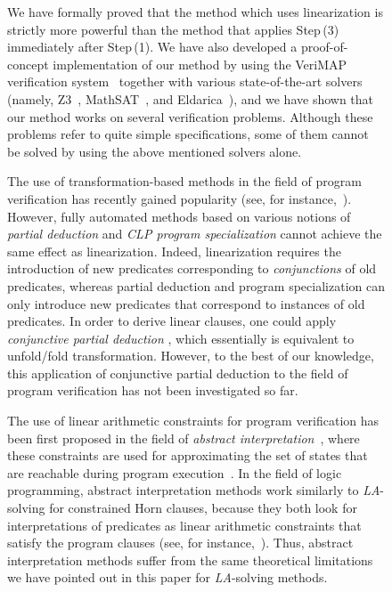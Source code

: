 \documentclass[english]{tlp}
\begin{document}
\begin{figure}[ht]
\begin{flushleft}
\begin{minipage}{124mm}
We have formally proved that the method {which uses} {\rm linearization} 
is strictly more
powerful than the method that applies Step\,(3) immediately after Step\,(1).
We have also developed a proof-of-concept implementation of our method 
by using the VeriMAP verification system~\cite{De&14b} together with 
various state-of-the-art solvers
(namely, Z3~\cite{DeB08}, MathSAT~\cite{MaS13}, and Eldarica~\cite{Ru&13}), and we 
have shown that our method works on several verification problems.
Although these problems refer to
quite simple specifications, some of them cannot be solved by {using the above mentioned solvers alone.}


The use of transformation-based methods in the field of program verification 
has recently gained  popularity  (see, 
for instance,~\cite{Al&07,De&14c,Fi&13a,KaG15a,LeM99,LiN08,Pe&98}). 
However, fully automated methods based on various notions
of {\it partial deduction} and {\it CLP program specialization} cannot
achieve the same effect as {\rm linearization}. Indeed, 
{\rm linearization} requires the introduction of new predicates corresponding
to {\it conjunctions} of old {predicates}, whereas {partial deduction} and {program specialization}
can only introduce new predicates that correspond to instances of old 
{predicates}.
In order to derive linear clauses, one could apply {\it conjunctive partial deduction}
\cite{De&99}, which essentially is equivalent to unfold/fold transformation. However, 
to the best of our knowledge, this 
application of conjunctive partial deduction to the field of program verification
has not been investigated {so far}.


The use of linear arithmetic constraints for program verification
has been first proposed in the field of 
{\it abstract interpretation}~\cite{CoC77}, where
these constraints are used for approximating the set of states that
are reachable during program execution~\cite{CoH78}.
In the field of logic programming, abstract interpretation methods work similarly to 
{\it LA}-solving for constrained Horn clauses, 
because they both 
look for interpretations of predicates as linear arithmetic 
constraints that satisfy {the} program clauses 
(see, for instance,~\cite{BeK96}).
Thus, abstract interpretation methods suffer from the 
same theoretical limitations we 
have pointed out in this paper for {\it LA}-solving methods.


\end{minipage}
\end{flushleft}
\end{figure}
\end{document}
